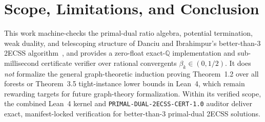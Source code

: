 \documentclass[11pt,twocolumn]{article}
\newcommand{\QQ}{\mathbb{Q}}
\begin{document}
\section{Scope, Limitations, and Conclusion}\label{sec:conclusion}
This work machine-checks the primal-dual ratio algebra, potential termination, weak duality, and telescoping structure of Danciu and Ibrahimpur's better-than-3 2ECSS algorithm~\cite{danciu2026twoconnected}, and provides a zero-float exact-$\QQ$ implementation and sub-millisecond certificate verifier over rational convergents $\beta_k \in (0,1/2)$. It does \emph{not} formalize the general graph-theoretic induction proving Theorem~1.2 over all forests or Theorem~3.5 tight-instance lower bounds in Lean~4, which remain rewarding targets for future graph-theory formalization. Within its verified scope, the combined Lean~4 kernel and \texttt{PRIMAL-DUAL-2ECSS-CERT-1.0} auditor deliver exact, manifest-locked verification for better-than-3 primal-dual 2ECSS solutions.



\end{document}
